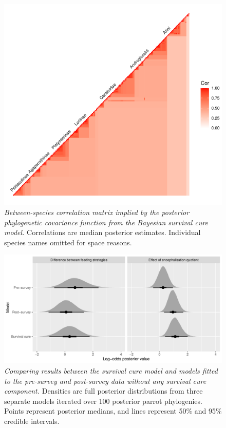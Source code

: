 \documentclass[
  man, donotrepeattitle,floatsintext]{apa6}
\begin{document}
\newpage



\begin{figure}
\centering
\includegraphics{manuscript_files/figure-latex/plotSurvCure6-1.pdf}
\caption{\label{fig:plotSurvCure6}\emph{Between-species correlation matrix implied by the posterior phylogenetic covariance function from the Bayesian survival cure model.} Correlations are median posterior estimates. Individual species names omitted for space reasons.}
\end{figure}

\newpage



\begin{figure}
\centering
\includegraphics{manuscript_files/figure-latex/plotComparison-1.pdf}
\caption{\label{fig:plotComparison}\emph{Comparing results between the survival cure model and models fitted to the pre-survey and post-survey data without any survival cure component.} Densities are full posterior distributions from three separate models iterated over 100 posterior parrot phylogenies. Points represent posterior medians, and lines represent 50\% and 95\% credible intervals.}
\end{figure}
\end{document}
